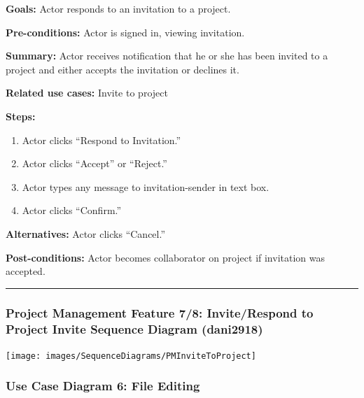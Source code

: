 \documentclass[twoside,letterpaper]{article}
\begin{document}
\noindent \textbf{Goals:} Actor responds to an invitation to a project.\newline

\noindent  \textbf{Pre-conditions:} Actor is signed in, viewing invitation.  \newline

\noindent \textbf{Summary:} Actor receives notification that he or she has been invited to a project and either accepts the invitation or declines it. \newline

\noindent \textbf{Related use cases:} Invite to project \newline

\noindent \textbf{Steps:} \begin{enumerate}
  \item Actor clicks ``Respond to Invitation.''
  \item Actor clicks ``Accept'' or ``Reject.''
  \item Actor types any message to invitation-sender in text box.
  \item Actor clicks ``Confirm.''
 \end{enumerate}
 
\noindent  \textbf{Alternatives:} Actor clicks ``Cancel.'' \newline

\noindent  \textbf{Post-conditions:} Actor becomes collaborator on project if invitation was accepted. \newline
\vspace{8pt}
\hrule
\vspace{20pt} \newpage

\subsubsection[Project Management Feature 7/8: Invite/Respond to Project Invite Sequence Diagram (dani2918)]{\rmfamily\bfseries\color{black}
	Project Management Feature 7/8:  Invite/Respond to Project Invite Sequence Diagram (dani2918)}
\texttt{[image: images/SequenceDiagrams/PMInviteToProject]}
\newpage











\subsubsection[Use Case Diagram 6: File Editing]{\rmfamily\bfseries\color{black}
	Use Case Diagram 6: File Editing}
\end{document}
